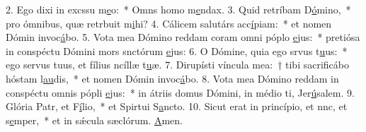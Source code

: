 2. Ego dixi in excssu m\uline{e}o:~* Omns homo m\uline{e}ndax.
3. Quid retríbam D\uline{ó}mino,~* pro ómnibus, quæ retrbuit m\uline{i}hi?
4. Cálicem salutárs acc\uline{í}piam:~* et nomen Dómin invoc\uline{á}bo.
5. Vota mea Dómino reddam coram omni póplo \uline{e}jus:~* pretiósa in conspéctu Dómini mors snctórum \uline{e}jus:
6. O Dómine, quia ego srvus t\uline{u}us:~* ego servus tuus, et fílius ncíllæ t\uline{u}æ.
7. Dirupísti víncula mea:~† tibi sacrificábo hóstam l\uline{au}dis,~* et nomen Dómin invoc\uline{á}bo.
8. Vota mea Dómino reddam in conspéctu omnis pópli \uline{e}jus:~* in átriis domus Dómini, in médio ti, Jer\uline{ú}salem.
9. Glória Patr, et F\uline{í}lio,~* et Spirtui S\uline{a}ncto.
10. Sicut erat in princípio, et nnc, et s\uline{e}mper,~* et in sǽcula sæclórum. \uline{A}men.
